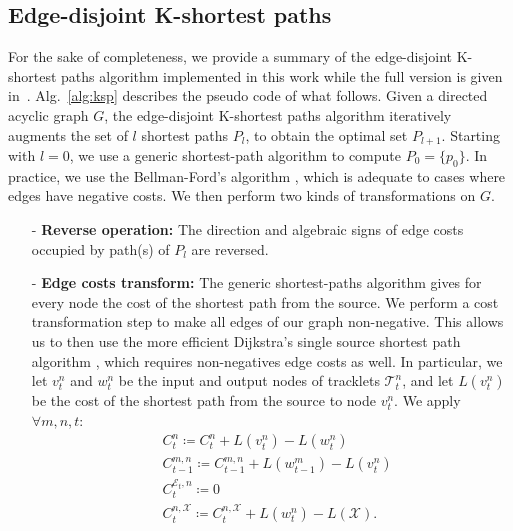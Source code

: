 \begin{subappendices}
\section{Edge-disjoint K-shortest paths}
\label{sec:ksp}

For the sake of completeness, we provide a summary of the edge-disjoint K-shortest paths algorithm implemented in this work while the full version is given in~\cite{suurballe74}.
Alg.~\ref{alg:ksp} describes the pseudo code of what follows.
Given a directed acyclic graph $G$, the edge-disjoint K-shortest paths algorithm iteratively augments the set of $l$ shortest paths $P_{l}$, to obtain the optimal set $P_{l+1}$. Starting with $l=0$, we use a generic shortest-path algorithm to compute $P_0=\{p_0\}$.
In practice, we use the Bellman-Ford's algorithm \cite{bellman58}, which is adequate to cases where edges have negative costs. We then perform two kinds of transformations on $G$.

\begin{itemize}
\item[-]  {\bf{Reverse operation:}} The direction and algebraic signs of edge costs occupied by path(s) of $P_{l}$ are reversed.
\item[-] {\bf{Edge costs transform:}}
The generic shortest-paths algorithm gives for every node the cost of the shortest path from the source. We perform a cost transformation step to make all edges of our graph non-negative. This allows us to then use the more efficient Dijkstra's single source shortest path algorithm \cite{dijkstra59}, which requires non-negatives edge costs as well.
In particular, we let $v_t^n$ and $w_t^n$ be the input and output nodes of tracklets $\mathcal{T}_t^n$, and let $L(v_t^n)$ be the cost of the shortest path from the source to node $v_t^n$. We apply $\forall m,n,t$:
\begin{subequations}
\label{eq:cost_transform}
\begin{align}
&C_t^{n} \coloneqq C_t^n + L(v_t^n) - L(w_t^n)\label{eq:cost_transform_tracklet}\\
&C_{t-1}^{m,n} \coloneqq C_{t-1}^{m,n} + L(w_{t-1}^m) - L(v_{t}^n)\label{eq:cost_transform_transition}\\
&C_t^{\mathcal{E}_t,n} \coloneqq 0 \label{eq:cost_transform_entrance}\\
&C_t^{n,\mathcal{X}} \coloneqq C_t^{n,\mathcal{X}} + L(w_t^n) - L(\mathcal{X}). \label{eq:cost_transform_sink}
\end{align}
\end{subequations}
\end{itemize}


\end{subappendices}
